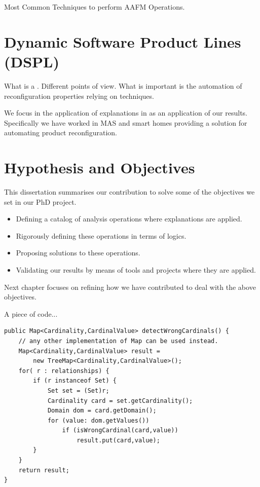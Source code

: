 Most Common Techniques to perform AAFM Operations.


\section{Dynamic Software Product Lines (DSPL)}
What is a \dspl. Different points of view. What is important is the automation of reconfiguration properties relying on \spl techniques.

We focus in the application of explanations in \dspls as an application of our results. Specifically we have worked in MAS and smart homes providing a solution for automating product reconfiguration.

\section{Hypothesis and Objectives}



This dissertation summarises our contribution to solve some of the objectives we set in our PhD project. 

\begin{itemize}
\item Defining a catalog of analysis operations where explanations are applied.
\item Rigorously defining these operations in terms of logics.
\item Proposing solutions to these operations.
\item Validating our results by means of tools and projects where they are applied. 
\end{itemize}

Next chapter focuses on refining how we have contributed to deal with the above objectives.

A piece of code...

\begin{lstlisting}[style=javacode]
public Map<Cardinality,CardinalValue> detectWrongCardinals() {
	// any other implementation of Map can be used instead.
	Map<Cardinality,CardinalValue> result = 
		new TreeMap<Cardinality,CardinalValue>();
	for( r : relationships) {
		if (r instanceof Set) {
			Set set = (Set)r;
			Cardinality card = set.getCardinality();
			Domain dom = card.getDomain();
			for (value: dom.getValues())
				if (isWrongCardinal(card,value))
					result.put(card,value);
		}
	}
	return result;
}
\end{lstlisting}

